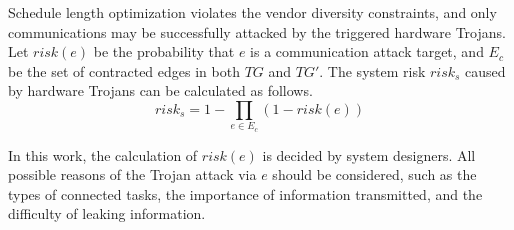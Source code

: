 \documentclass[10pt,journal]{IEEEtran}
\newtheorem{definition}{\textbf{Definition}}
\begin{document}
Schedule length optimization violates the vendor diversity constraints, and only communications may be successfully attacked by the triggered hardware Trojans. Let $risk(e)$ be the probability that $e$ is a communication attack target, and $E_c$ be the set of contracted edges in both $TG$ and $TG'$. The system risk $risk_s$ caused by hardware Trojans can be calculated as follows.
\begin{equation}
risk_s=1-\prod \limits_{e\in E_c}(1-risk(e))
\end{equation}


In this work, the calculation of $risk(e)$ is decided by system designers. All possible reasons of the Trojan attack via $e$ should be considered, such as the types of connected tasks, the importance of information transmitted, and the difficulty of leaking information.






\end{document}
